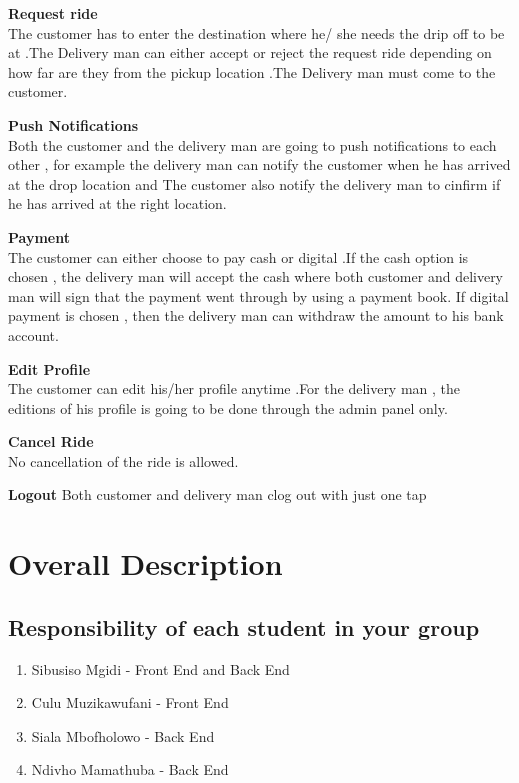 \documentclass[11pt]{article}
\begin{document}
\textbf {Request ride}\\
The customer has to enter the destination where he/ she needs the drip off to be at .The Delivery man can either accept or reject the request ride  depending on  how far are they from the pickup location .The Delivery man must come to the customer.

\textbf{Push Notifications}\\
Both the customer and the delivery man are going to push notifications to each other , for example the delivery man can notify the customer when he has arrived at the drop location and The customer also notify the delivery man to cinfirm if he has arrived at the right location.

\textbf{Payment}\\
The customer can either choose to pay cash or digital .If the cash option is chosen , the delivery man will accept the cash where both customer and delivery man will sign that the payment went through by using  a payment book. If digital payment is chosen , then the delivery man can withdraw the amount to his bank account.

\textbf{Edit Profile}\\
The customer  can edit his/her profile anytime .For the delivery man , the editions of his profile is going to be done through the admin panel only.

\textbf{Cancel Ride}\\
No cancellation of the ride is allowed.

\textbf{Logout}
Both customer and delivery man clog out with just one tap




\section {\Large Overall Description}
\subsection{\Large Responsibility of each student in your group}
\begin{enumerate}
 \item Sibusiso Mgidi - Front End and Back End
 \item Culu Muzikawufani - Front End
 \item Siala Mbofholowo - Back End
 \item Ndivho Mamathuba - Back End  
\end{enumerate} 
\end{document}
